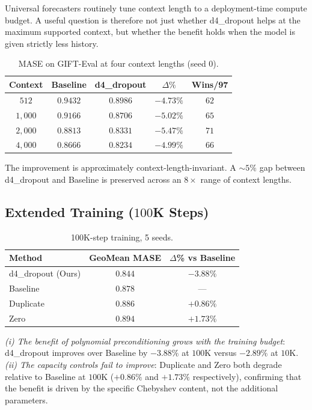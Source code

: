 \documentclass[11pt]{article}
\theoremstyle{plain}
\theoremstyle{definition}
\theoremstyle{remark}
\newcommand{\HD}{\textsf{d4\_dropout}}
\newcommand{\Baseline}{\textsf{Baseline}}
\newcommand{\Zero}{\textsf{Zero}}
\newcommand{\Dup}{\textsf{Duplicate}}
\begin{document}
Universal forecasters routinely tune context length to a deployment-time compute budget. A useful question is therefore not just whether \HD{} helps at the maximum supported context, but whether the benefit holds when the model is given strictly less history.

\begin{table}[h]
\centering
\small
\caption{MASE on GIFT-Eval at four context lengths (seed 0). }
\label{tab:contextlen}
\begin{tabular}{ccccc}
\toprule
\textbf{Context} & \textbf{\Baseline{}} & \textbf{\HD{}} & \textbf{$\Delta\%$} & \textbf{Wins/97} \\
\midrule
$512$    & $0.9432$ & $0.8986$ & $-4.73\%$ & $62$ \\
$1{,}000$  & $0.9166$ & $0.8706$ & $-5.02\%$ & $65$ \\
$2{,}000$  & $0.8813$ & $0.8331$ & $-5.47\%$ & $71$ \\
$4{,}000$  & $0.8666$ & $0.8234$ & $-4.99\%$ & $66$ \\
\bottomrule
\end{tabular}
\end{table}

The improvement is approximately context-length-invariant. A $\sim 5\%$ gap between \HD{} and \Baseline{} is preserved across an $8\times$ range of context lengths. 

\subsection{Extended Training ($100$K Steps)}
\label{sec:100k}

\begin{table}[h]
\centering
\small
\caption{100K-step training, 5 seeds.}
\label{tab:100k}
\begin{tabular}{lcc}
\toprule
\textbf{Method} & \textbf{GeoMean MASE} & \textbf{$\Delta$\% vs \Baseline{}} \\
\midrule
\HD{} (Ours) & $\mathbf{0.844}$ & $\mathbf{-3.88\%}$ \\
\Baseline{} & $0.878$ & --- \\
\Dup{} & $0.886$ & $+0.86\%$ \\
\Zero{} & $0.894$ & $+1.73\%$ \\
\bottomrule
\end{tabular}
\end{table}

\emph{(i) The benefit of polynomial preconditioning grows with the training budget}: \HD{} improves over \Baseline{} by $-3.88\%$ at $100$K versus $-2.89\%$ at $10$K. \emph{(ii) The capacity controls fail to improve}: \Dup{} and \Zero{} both degrade relative to \Baseline{} at $100$K ($+0.86\%$ and $+1.73\%$ respectively), confirming that the benefit is driven by the specific Chebyshev content, not the additional parameters.
\end{document}

